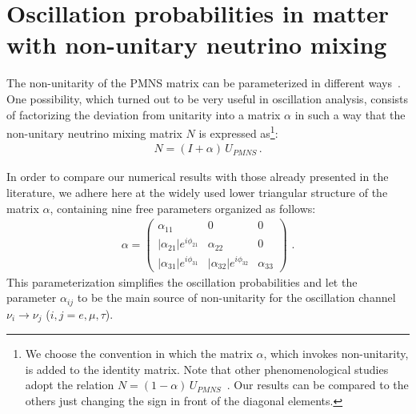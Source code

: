 \documentclass[11pt,a4paper]{article}
\begin{document}

\section{Oscillation probabilities in matter with non-unitary neutrino mixing}
\label{formulae}
The non-unitarity of the PMNS matrix can be parameterized in different ways~\cite{Antusch:2006vwa, Xing:2012kh,Flieger:2019eor,Bielas:2017lok,Ellis:2020ehi,Hu:2020oba}. 
One possibility, which turned out to be very useful in oscillation analysis, consists of factorizing the deviation from unitarity into a matrix $\alpha$ in such a way that the non-unitary neutrino mixing matrix $N$ is expressed as\footnote{We choose the convention in which the matrix $\alpha$, which invokes non-unitarity, is added to the identity matrix. Note that other phenomenological studies adopt the relation $N=(1-\alpha)\,U_{PMNS}$~\cite{Blennow:2016jkn}. Our results can be compared to the others just changing the sign in front of the diagonal elements.}:
\begin{eqnarray}\label{matriceN}
N=(I+\alpha)\,U_{PMNS}\,.
    \end{eqnarray}
    
In order to compare our numerical results with those already presented in the literature, we adhere here at the widely used lower triangular structure of the matrix $\alpha$, containing nine free parameters organized as follows:   
\begin{eqnarray}
\alpha=
\begin{pmatrix}
\alpha_{11} & 0 & 0 \\
|\alpha_{21}|e^{i \phi_{21}} & \alpha_{22} & 0 \\
|\alpha_{31}|e^{i \phi_{31}} & |\alpha_{32}|e^{i \phi_{32}} & \alpha_{33} 
\end{pmatrix}\, \, .
\label{eq:NU-triangle-mat}
\end{eqnarray}
This parameterization simplifies the oscillation probabilities and let the parameter $\alpha_{ij}$ to be the main source of non-unitarity for the oscillation channel $\nu_i\to\nu_j$ ($i,j = e,\mu,\tau$).
\end{document}
